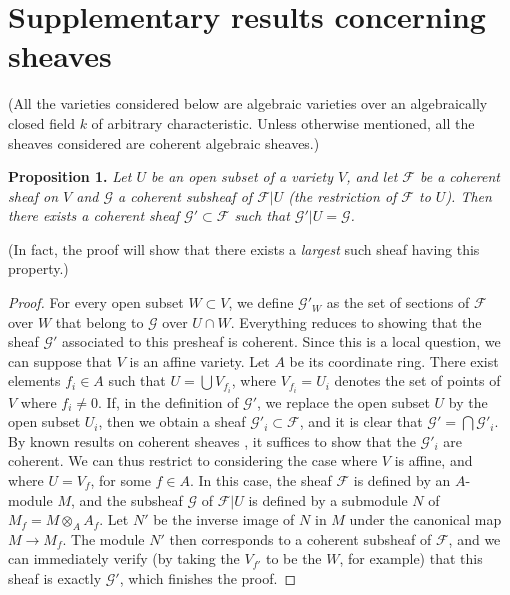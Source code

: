 \documentclass{article}
\newenvironment{itenv}[1]
  {\phantomsection\par\medskip\noindent\textbf{#1.}\itshape}
  {\par\medskip}
\newcommand{\scr}[1]{{\mathscr{#1}}}
\newcommand{\oldpage}[1]{\marginpar{\footnotesize$\Big\vert$ \textit{p.~#1}}}
\begin{document}
\section{Supplementary results concerning sheaves}
\label{section1}

(All the varieties considered below are algebraic varieties over an algebraically closed field $k$ of arbitrary characteristic. Unless otherwise mentioned, all the sheaves considered are coherent algebraic sheaves.)

\begin{itenv}{Proposition 1}
\label{proposition1}
\oldpage{98}
  Let $U$ be an open subset of a variety $V$, and let $\scr{F}$ be a coherent sheaf on $V$ and $\scr{G}$ a coherent subsheaf of $\scr{F}|U$ (the restriction of $\scr{F}$ to $U$).
  Then there exists a coherent sheaf $\scr{G}'\subset\scr{F}$ such that $\scr{G}'|U=\scr{G}$.
\end{itenv}

(In fact, the proof will show that there exists a \emph{largest} such sheaf having this property.)

\begin{proof}
  For every open subset $W\subset V$, we define $\scr{G}'_W$ as the set of sections of $\scr{F}$ over $W$ that belong to $\scr{G}$ over $U\cap W$.
  Everything reduces to showing that the sheaf $\scr{G}'$ associated to this presheaf is coherent.
  Since this is a local question, we can suppose that $V$ is an affine variety.
  Let $A$ be its coordinate ring.
  There exist elements $f_i\in A$ such that $U=\bigcup V_{f_i}$, where $V_{f_i}=U_i$ denotes the set of points of $V$ where $f_i\neq0$.
  If, in the definition of $\scr{G}'$, we replace the open subset $U$ by the open subset $U_i$, then we obtain a sheaf $\scr{G}'_i\subset\scr{F}$, and it is clear that $\scr{G}'=\bigcap\scr{G}'_i$.
  By known results on coherent sheaves \cite[p.~209]{12}, it suffices to show that the $\scr{G}'_i$ are coherent.
  We can thus restrict to considering the case where $V$ is affine, and where $U=V_f$, for some $f\in A$.
  In this case, the sheaf $\scr{F}$ is defined by an $A$-module $M$, and the subsheaf $\scr{G}$ of $\scr{F}|U$ is defined by a submodule $N$ of $M_f=M\otimes_A A_f$.
  Let $N'$ be the inverse image of $N$ in $M$ under the canonical map $M\to M_f$.
  The module $N'$ then corresponds to a coherent subsheaf of $\scr{F}$, and we can immediately verify (by taking the $V_{f'}$ to be the $W$, for example) that this sheaf is exactly $\scr{G}'$, which finishes the proof.
\end{proof}
\end{document}
